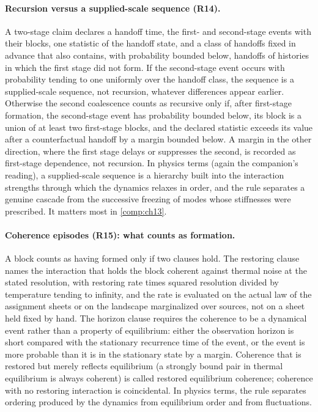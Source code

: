 \paragraph{Recursion versus a supplied-scale sequence (R14).}
A two-stage claim declares a handoff time, the first- and second-stage events with their blocks, one
statistic of the handoff state, and a class of handoffs fixed in advance that also contains, with
probability bounded below, handoffs of histories in which the first stage did not form. If the
second-stage event occurs with probability tending to one uniformly over the handoff class, the
sequence is a supplied-scale sequence, not recursion, whatever differences appear earlier. Otherwise
the second coalescence counts as recursive only if, after first-stage formation, the second-stage
event has probability bounded below, its block is a union of at least two first-stage blocks, and
the declared statistic exceeds its value after a counterfactual handoff by a margin bounded below. A
margin in the other direction, where the first stage delays or suppresses the second, is recorded as
first-stage dependence, not recursion. In physics terms (again the companion's reading), a
supplied-scale sequence is a hierarchy built into the interaction strengths through which the
dynamics relaxes in order, and the rule separates a genuine cascade from the successive freezing of
modes whose stiffnesses were prescribed. It matters most in \cref{comp:ch13}.

\paragraph{Coherence episodes (R15): what counts as formation.}
A block counts as having formed only if two clauses hold. The restoring clause names the interaction
that holds the block coherent against thermal noise at the stated resolution, with restoring rate
times squared resolution divided by temperature tending to infinity, and the rate is evaluated on the
actual law of the assignment sheets or on the landscape marginalized over sources, not on a sheet
held fixed by hand. The horizon clause requires the
coherence to be a dynamical event rather than a property of equilibrium: either the observation
horizon is short compared with the stationary recurrence time of the event, or the event is more
probable than it is in the stationary state by a margin. Coherence that is restored but merely
reflects equilibrium (a strongly bound pair in thermal equilibrium is always coherent) is called
restored equilibrium coherence; coherence with no restoring interaction is coincidental. In physics
terms, the rule separates ordering produced by the dynamics from equilibrium order and from
fluctuations.

